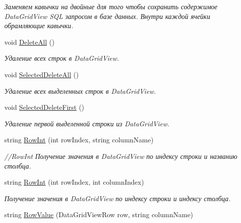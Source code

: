 \begin{DoxyCompactItemize}
\begin{DoxyCompactList}\small\item\em Заменяем кавычки на двойные для того чтобы сохранить содержимое Data\+Grid\+View S\+QL запросом в базе данных. Внутри каждой ячейки обрамляющие кавычки. \end{DoxyCompactList}\item 
void \mbox{\hyperlink{class_f_b_a_1_1_data_grid_view_f_b_a_ad9ddb7187b269c1b65cfc252fed9e36f}{Delete\+All}} ()
\begin{DoxyCompactList}\small\item\em Удаление всех строк в Data\+Grid\+View. \end{DoxyCompactList}\item 
void \mbox{\hyperlink{class_f_b_a_1_1_data_grid_view_f_b_a_ac4aed4d493c86b920a56db4cda551d97}{Selected\+Delete\+All}} ()
\begin{DoxyCompactList}\small\item\em Удаление всех выделенных строк в Data\+Grid\+View. \end{DoxyCompactList}\item 
void \mbox{\hyperlink{class_f_b_a_1_1_data_grid_view_f_b_a_a3ecc31f2d95f2f000bc37f1d305a4a1e}{Selected\+Delete\+First}} ()
\begin{DoxyCompactList}\small\item\em Удаление первой выделенной строки из Data\+Grid\+View. \end{DoxyCompactList}\item 
string \mbox{\hyperlink{class_f_b_a_1_1_data_grid_view_f_b_a_a0205d4009ab40c597292f0d0979a05d7}{Row\+Int}} (int row\+Index, string column\+Name)
\begin{DoxyCompactList}\small\item\em //\+Row\+Int Получение значения в Data\+Grid\+View по индексу строки и названию столбца. \end{DoxyCompactList}\item 
string \mbox{\hyperlink{class_f_b_a_1_1_data_grid_view_f_b_a_a75a3a34be8a2a52927dd0fe9f7ec1b9e}{Row\+Int}} (int row\+Index, int column\+Index)
\begin{DoxyCompactList}\small\item\em Получение значения в Data\+Grid\+View по индексу строки и индексу столбца. \end{DoxyCompactList}\item 
string \mbox{\hyperlink{class_f_b_a_1_1_data_grid_view_f_b_a_a94a049f02fa7e5dea582532d67212ddc}{Row\+Value}} (Data\+Grid\+View\+Row row, string column\+Name)

\end{DoxyCompactItemize}

